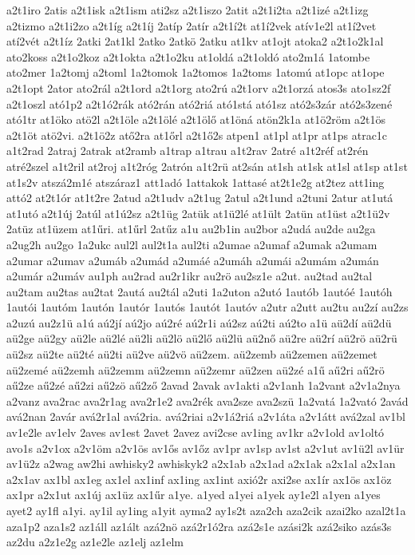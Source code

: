 {a2t1iro
2atis
a2t1isk
a2t1ism
ati2sz
a2t1iszo
2atit
a2t1i2ta
a2t1izé
a2t1izg
a2tizmo
a2t1i2zo
a2t1íg
a2t1íj
2atíp
2atír
a2t1í2t
at1í2vek
atív1e2l
at1í2vet
atí2vét
a2t1íz
2atki
2at1kl
2atko
2atkö
2atku
at1kv
at1ojt
atoka2
a2t1o2k1al
ato2koss
a2t1o2koz
a2t1okta
a2t1o2ku
at1oldá
a2t1oldó
ato2m1á
1atombe
ato2mer
1a2tomj
a2toml
1a2tomok
1a2tomos
1a2toms
1atomú
at1opc
at1ope
a2t1opt
2ator
ato2rál
a2t1ord
a2t1org
ato2rú
a2t1orv
a2t1orzá
atos3s
ato1sz2f
a2t1oszl
ató1p2
a2t1ó2rák
ató2rán
ató2riá
ató1stá
ató1sz
ató2s3zár
ató2s3zené
ató1tr
at1öko
atö2l
a2t1öle
a2t1ölé
a2t1ölő
at1öná
atön2k1a
at1ö2röm
a2t1ös
a2t1öt
atö2vi.
a2t1ö2z
atő2ra
at1őrl
a2t1ő2s
atpen1
at1pl
at1pr
at1ps
atrac1c
a1t2rad
2atraj
2atrak
at2ramb
a1trap
a1trau
a1t2rav
2atré
a1t2réf
at2rén
atré2szel
a1t2ril
at2roj
a1t2róg
2atrón
a1t2rü
at2sán
at1sh
at1sk
at1sl
at1sp
at1st
at1s2v
atszá2m1é
atszáraz1
att1adó
1attakok
1attasé
at2t1e2g
at2tez
att1ing
attó2
at2t1ór
at1t2re
2atud
a2t1udv
a2t1ug
2atul
a2t1und
a2tuni
2atur
at1utá
at1utó
a2t1új
2atúl
at1ú2sz
a2t1üg
2atük
at1ü2lé
at1ült
2atün
at1üst
a2t1ü2v
2atüz
at1üzem
at1űri.
at1űrl
2atűz
a1u
au2b1in
au2bor
a2udá
au2de
au2ga
a2ug2h
au2go
1a2ukc
aul2l
aul2t1a
aul2ti
a2umae
a2umaf
a2umak
a2umam
a2umar
a2umav
a2umáb
a2umád
a2umáé
a2umáh
a2umái
a2umám
a2umán
a2umár
a2umáv
au1ph
au2rad
au2r1ikr
au2rö
au2sz1e
a2ut.
au2tad
au2tal
au2tam
au2tas
au2tat
2autá
au2tál
a2uti
1a2uton
a2utó
1autób
1autóé
1autóh
1autói
1autóm
1autón
1autór
1autós
1autót
1autóv
a2utr
a2utt
au2tu
au2zí
au2zs
a2uzú
au2z1ü
a1ú
aú2jí
aú2jo
aú2ré
aú2r1i
aú2sz
aú2ti
aú2to
a1ü
aü2dí
aü2dü
aü2ge
aü2gy
aü2le
aü2lé
aü2li
aü2lö
aü2lő
aü2lü
aü2nő
aü2re
aü2rí
aü2rö
aü2rü
aü2sz
aü2te
aü2té
aü2ti
aü2ve
aü2vö
aü2zem.
aü2zemb
aü2zemen
aü2zemet
aü2zemé
aü2zemh
aü2zemm
aü2zemn
aü2zemr
aü2zen
aü2zé
a1ű
aű2ri
aű2rö
aű2ze
aű2zé
aű2zi
aű2zö
aű2ző
2avad
2avak
av1akti
a2v1anh
1a2vant
a2v1a2nya
a2vanz
ava2rac
ava2r1ag
ava2r1e2
ava2rék
ava2sze
ava2szü
1a2vatá
1a2vató
2avád
avá2nan
2avár
avá2r1al
avá2ria.
avá2riai
a2v1á2riá
a2v1áta
a2v1átt
avá2zal
av1bl
av1e2le
av1elv
2aves
av1est
2avet
2avez
avi2cse
av1ing
av1kr
a2v1old
av1oltó
avo1s
a2v1ox
a2v1öm
a2v1ös
av1ős
av1őz
av1pr
av1sp
av1st
a2v1ut
av1ü2l
av1ür
av1ü2z
a2wag
aw2hi
awhisky2
awhiskyk2
a2x1ab
a2x1ad
a2x1ak
a2x1al
a2x1an
a2x1av
ax1bl
ax1eg
ax1el
ax1inf
ax1ing
ax1int
axió2r
axi2se
ax1ír
ax1ös
ax1öz
ax1pr
a2x1ut
ax1új
ax1üz
ax1űr
a1ye.
a1yed
a1yei
a1yek
ay1e2l
a1yen
a1yes
ayet2
ay1fl
a1yi.
ay1il
ay1ing
a1yit
ayma2
ay1s2t
aza2ch
aza2cik
azai2ko
azal2t1a
aza1p2
aza1s2
az1áll
az1ált
azá2nö
azá2r1ó2ra
azá2s1e
azási2k
azá2siko
azás3s
az2du
a2z1e2g
az1e2le
az1elj
az1elm
}
